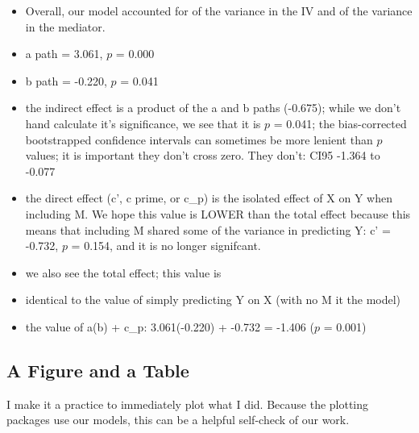 \documentclass[
  11pt,
]{book}
\providecommand{\tightlist}{%
  \setlength{\itemsep}{0pt}\setlength{\parskip}{0pt}}
\begin{document}
\begin{itemize}
\tightlist
\item
  Overall, our model accounted for of the variance in the IV and of the variance in the mediator.
\item
  a path = 3.061, \(p\) = 0.000
\item
  b path = -0.220, \(p\) = 0.041
\item
  the indirect effect is a product of the a and b paths (-0.675); while we don't hand calculate it's significance, we see that it is \(p\) = 0.041; the bias-corrected bootstrapped confidence intervals can sometimes be more lenient than \(p\) values; it is important they don't cross zero. They don't: CI95 -1.364 to -0.077\\
\item
  the direct effect (c', c prime, or c\_p) is the isolated effect of X on Y when including M. We hope this value is LOWER than the total effect because this means that including M shared some of the variance in predicting Y: c' = -0.732, \(p\) = 0.154, and it is no longer signifcant.
\item
  we also see the total effect; this value is
\item
  identical to the value of simply predicting Y on X (with no M it the model)
\item
  the value of a(b) + c\_p: 3.061(-0.220) + -0.732 = -1.406 (\(p\) = 0.001)
\end{itemize}

\hypertarget{a-figure-and-a-table}{%
\subsection{A Figure and a Table}\label{a-figure-and-a-table}}

I make it a practice to immediately plot what I did. Because the plotting packages use our models, this can be a helpful self-check of our work.
\end{document}
